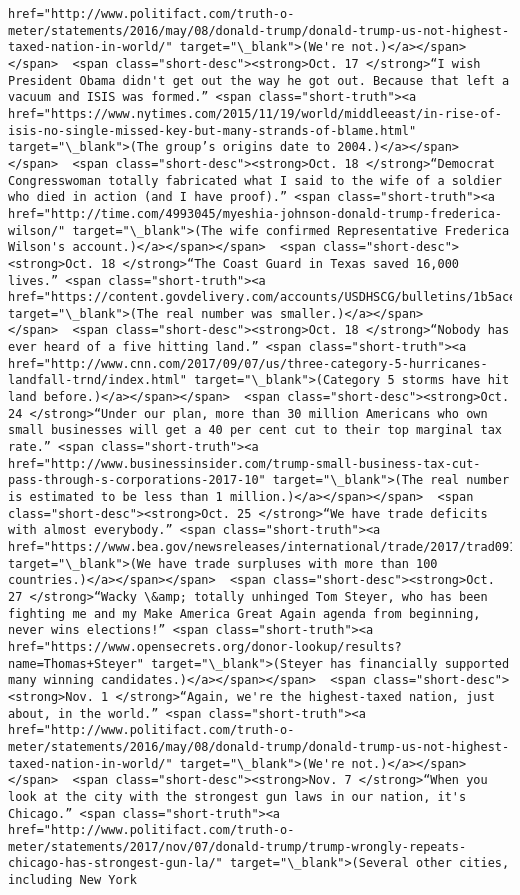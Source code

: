 \documentclass[11pt]{article}
\begin{document}
\begin{Verbatim}[commandchars=\\\{\}]
href="http://www.politifact.com/truth-o-meter/statements/2016/may/08/donald-trump/donald-trump-us-not-highest-taxed-nation-in-world/" target="\_blank">(We're not.)</a></span></span>  <span class="short-desc"><strong>Oct. 17 </strong>“I wish President Obama didn't get out the way he got out. Because that left a vacuum and ISIS was formed.” <span class="short-truth"><a href="https://www.nytimes.com/2015/11/19/world/middleeast/in-rise-of-isis-no-single-missed-key-but-many-strands-of-blame.html" target="\_blank">(The group’s origins date to 2004.)</a></span></span>  <span class="short-desc"><strong>Oct. 18 </strong>“Democrat Congresswoman totally fabricated what I said to the wife of a soldier who died in action (and I have proof).” <span class="short-truth"><a href="http://time.com/4993045/myeshia-johnson-donald-trump-frederica-wilson/" target="\_blank">(The wife confirmed Representative Frederica Wilson's account.)</a></span></span>  <span class="short-desc"><strong>Oct. 18 </strong>“The Coast Guard in Texas saved 16,000 lives.” <span class="short-truth"><a href="https://content.govdelivery.com/accounts/USDHSCG/bulletins/1b5ace3" target="\_blank">(The real number was smaller.)</a></span></span>  <span class="short-desc"><strong>Oct. 18 </strong>“Nobody has ever heard of a five hitting land.” <span class="short-truth"><a href="http://www.cnn.com/2017/09/07/us/three-category-5-hurricanes-landfall-trnd/index.html" target="\_blank">(Category 5 storms have hit land before.)</a></span></span>  <span class="short-desc"><strong>Oct. 24 </strong>“Under our plan, more than 30 million Americans who own small businesses will get a 40 per cent cut to their top marginal tax rate.” <span class="short-truth"><a href="http://www.businessinsider.com/trump-small-business-tax-cut-pass-through-s-corporations-2017-10" target="\_blank">(The real number is estimated to be less than 1 million.)</a></span></span>  <span class="short-desc"><strong>Oct. 25 </strong>“We have trade deficits with almost everybody.” <span class="short-truth"><a href="https://www.bea.gov/newsreleases/international/trade/2017/trad0917.htm" target="\_blank">(We have trade surpluses with more than 100 countries.)</a></span></span>  <span class="short-desc"><strong>Oct. 27 </strong>“Wacky \&amp; totally unhinged Tom Steyer, who has been fighting me and my Make America Great Again agenda from beginning, never wins elections!” <span class="short-truth"><a href="https://www.opensecrets.org/donor-lookup/results?name=Thomas+Steyer" target="\_blank">(Steyer has financially supported many winning candidates.)</a></span></span>  <span class="short-desc"><strong>Nov. 1 </strong>“Again, we're the highest-taxed nation, just about, in the world.” <span class="short-truth"><a href="http://www.politifact.com/truth-o-meter/statements/2016/may/08/donald-trump/donald-trump-us-not-highest-taxed-nation-in-world/" target="\_blank">(We're not.)</a></span></span>  <span class="short-desc"><strong>Nov. 7 </strong>“When you look at the city with the strongest gun laws in our nation, it's Chicago.” <span class="short-truth"><a href="http://www.politifact.com/truth-o-meter/statements/2017/nov/07/donald-trump/trump-wrongly-repeats-chicago-has-strongest-gun-la/" target="\_blank">(Several other cities, including New York 
\end{Verbatim}
\end{document}
